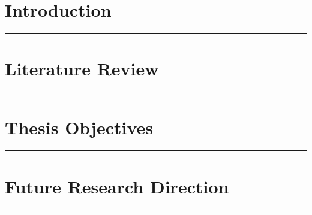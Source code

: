 \documentclass[12pt,phd,times]{pkmthesis}
\begin{document}
\chapter{Introduction}
\vspace{-1cm}
\noindent \rule{6.6in}{0.01in}
\label{chap:intro}
\chapter{Literature Review}
\vspace{-1cm}
\noindent \rule{6.6in}{0.01in}
\label{chap:L_survey}
\newpage

\chapter{Thesis Objectives}
\vspace{-1cm}
\noindent \rule{6.6in}{0.01in}
\label{chap:problem_statement}

\chapter{Future Research Direction}
\vspace{-1cm}
\noindent \rule{6.6in}{0.01in}
\label{chap:Future Direction}




\end{document}
